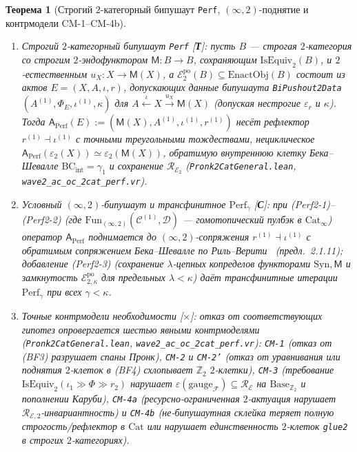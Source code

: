\documentclass[11pt]{article}
\theoremstyle{plain}
\newtheorem{theorem}{Теорема}[section]
\theoremstyle{definition}
\newcommand{\cF}{\mathcal{F}}
\newcommand{\cC}{\mathcal{C}}
\newcommand{\Fun}{\mathrm{Fun}}
\newcommand{\Cat}{\mathrm{Cat}}
\newcommand{\Syn}{\mathrm{Syn}}
\newcommand{\cE}{\mathcal{E}}
\begin{document}
\begin{theorem}[Строгий $2$-категорный бипушаут \texttt{Perf}, $(\infty,2)$-поднятие и контрмодели \textup{CM-1--CM-4b}]\label{thm:perf-2cat-obstructions}
\begin{enumerate}[nosep,label=(\roman*)]
\item \emph{Строгий $2$-категорный бипушаут \texttt{Perf} \textup{[\textbf{Т}]}}: пусть $B$ — строгая $2$-категория со строгим $2$-эндофунктором $\mathsf{M} : B \to B$, сохраняющим $\mathrm{IsEquiv}_2(B)$, и $2$-естественным $u_X : X \to \mathsf{M}(X)$, а $\cE_2^{\mathrm{po}}(B) \subseteq \mathrm{EnactObj}(B)$ состоит из актов $E = (X, A, \iota, r)$, допускающих данные бипушаута \texttt{BiPushout2Data} $(A^{(1)}, \Phi_E, \iota^{(1)}, \kappa)$ для $A \xleftarrow{\iota} X \xrightarrow{u_X} \mathsf{M}(X)$ (допуская нестрогие $\varepsilon_r$ и $\kappa$). Тогда $\mathsf{A}_{\mathrm{Perf}}(E) := (\mathsf{M}(X), A^{(1)}, \iota^{(1)}, r^{(1)})$ несёт рефлектор $r^{(1)} \dashv \iota^{(1)}$ с точными треугольными тождествами, нециклическое $\mathsf{A}_{\mathrm{Perf}}(\varepsilon_2(X)) \simeq \varepsilon_2(\mathsf{M}(X))$, обратимую внутреннюю клетку Бека--Шевалле $\mathrm{BC}_{\mathrm{int}} = \gamma_1$ и сохранение $\mathcal{R}_{\cE_2}$ (\texttt{Pronk2CatGeneral.lean}, \texttt{wave2\_ac\_oc\_2cat\_perf.vr}).
\item \emph{Условный $(\infty, 2)$-бипушаут и трансфинитное $\mathrm{Perf}_\gamma$ \textup{[\textbf{С}]}}: при \textup{(Perf2-1)--(Perf2-2)} (где $\Fun_{(\infty,2)}(\cC^{(1)}, \mathcal{D})$ — гомотопический пулбэк в $\Cat_\infty$) оператор $\mathsf{A}_{\mathrm{Perf}}$ поднимается до $(\infty, 2)$-сопряжения $r^{(1)} \dashv \iota^{(1)}$ с обратимым сопряжением Бека--Шевалле по Риль--Верити~\cite{RiehlVerity2022} (предл.~2.1.11); добавление \textup{(Perf2-3)} (сохранение $\lambda$-цепных копределов функторами $\Syn, \mathsf{M}$ и замкнутость $\cE_{2,\kappa}^{\mathrm{po}}$ для предельных $\lambda < \kappa$) даёт трансфинитные итерации $\mathrm{Perf}_\gamma$ при всех $\gamma < \kappa$.
\item \emph{Точные контрмодели необходимости \textup{[\textbf{$\times$}]}}: отказ от соответствующих гипотез опровергается шестью явными контрмоделями (\texttt{Pronk2CatGeneral.lean}, \texttt{wave2\_ac\_oc\_2cat\_perf.vr}): \texttt{CM-1} (отказ от \textup{(BF3)} разрушает спаны Пронк), \texttt{CM-2} и \texttt{CM-2'} (отказ от уравнивания или поднятия $2$-клеток в \textup{(BF4)} схлопывает $\mathbb{Z}_2$ $2$-клетки), \texttt{CM-3} (требование $\mathrm{IsEquiv}_2(\iota_1 \gg \Phi \gg r_2)$ нарушает $\varepsilon(\mathrm{gauge}_\cF) \subseteq \mathcal{R}_\cE$ на $\mathrm{Base}_{\mathbb{Z}_2}$ и пополнении Каруби), \texttt{CM-4a} (ресурсно-ограниченная $2$-актуация нарушает $\mathcal{R}_{\cE,2}$-инвариантность) и \texttt{CM-4b} (не-бипушаутная склейка теряет полную строгость/рефлектор в $\Cat$ или нарушает единственность $2$-клеток \texttt{glue2} в строгих $2$-категориях).
\end{enumerate}
\end{theorem}
\end{document}
